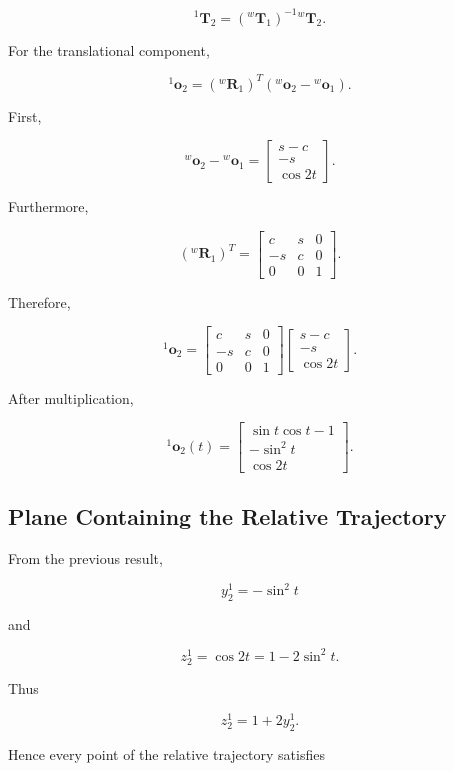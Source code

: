 \documentclass[11pt,a4paper]{article}
\begin{document}
\[
{}^{1}\bm{T}_2 =
({}^{w}\bm{T}_1)^{-1}
{}^{w}\bm{T}_2.
\]

For the translational component,

\[
{}^{1}\bm{o}_2
=
({}^{w}\bm{R}_1)^T
\left(
{}^{w}\bm{o}_2 -
{}^{w}\bm{o}_1
\right).
\]

First,

\[
{}^{w}\bm{o}_2 -
{}^{w}\bm{o}_1
=
\begin{bmatrix}
s-c\\
-s\\
\cos 2t
\end{bmatrix}.
\]

Furthermore,

\[
({}^{w}\bm{R}_1)^T =
\begin{bmatrix}
c & s & 0\\
-s & c & 0\\
0 & 0 & 1
\end{bmatrix}.
\]

Therefore,

\[
{}^{1}\bm{o}_2 =
\begin{bmatrix}
c & s & 0\\
-s & c & 0\\
0 & 0 & 1
\end{bmatrix}
\begin{bmatrix}
s-c\\
-s\\
\cos 2t
\end{bmatrix}.
\]

After multiplication,

\[
\boxed{
{}^{1}\bm{o}_2(t) =
\begin{bmatrix}
\sin t\cos t - 1\\
-\sin^2 t\\
\cos 2t
\end{bmatrix}
}.
\]

\subsection{Plane Containing the Relative Trajectory}

From the previous result,

\[
y_2^1 = -\sin^2 t
\]

and

\[
z_2^1 = \cos 2t
       = 1 - 2\sin^2 t.
\]

Thus

\[
z_2^1 = 1 + 2y_2^1.
\]

Hence every point of the relative trajectory satisfies
\end{document}
